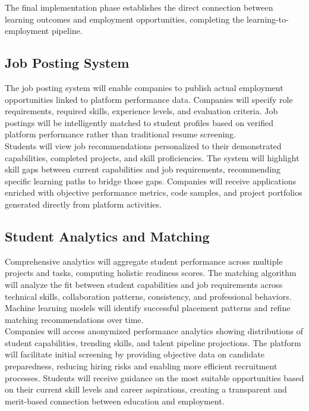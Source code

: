 \documentclass[12pt,a4paper]{report}
\begin{document}
The final implementation phase establishes the direct connection between learning outcomes and employment opportunities, completing the learning-to-employment pipeline.

\subsection{Job Posting System}

The job posting system will enable companies to publish actual employment opportunities linked to platform performance data. Companies will specify role requirements, required skills, experience levels, and evaluation criteria. Job postings will be intelligently matched to student profiles based on verified platform performance rather than traditional resume screening.\\[0.1cm]

Students will view job recommendations personalized to their demonstrated capabilities, completed projects, and skill proficiencies. The system will highlight skill gaps between current capabilities and job requirements, recommending specific learning paths to bridge those gaps. Companies will receive applications enriched with objective performance metrics, code samples, and project portfolios generated directly from platform activities.

\subsection{Student Analytics and Matching}

Comprehensive analytics will aggregate student performance across multiple projects and tasks, computing holistic readiness scores. The matching algorithm will analyze the fit between student capabilities and job requirements across technical skills, collaboration patterns, consistency, and professional behaviors. Machine learning models will identify successful placement patterns and refine matching recommendations over time.\\[0.1cm]

Companies will access anonymized performance analytics showing distributions of student capabilities, trending skills, and talent pipeline projections. The platform will facilitate initial screening by providing objective data on candidate preparedness, reducing hiring risks and enabling more efficient recruitment processes. Students will receive guidance on the most suitable opportunities based on their current skill levels and career aspirations, creating a transparent and merit-based connection between education and employment.
\end{document}
